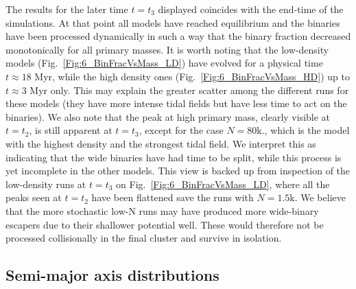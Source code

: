 The results for the later time $t = t_3$ displayed coincides with the end-time of the simulations. At that point all models have reached equilibrium and the binaries have been processed dynamically in such a way that the binary fraction decreased monotonically for all primary masses. It is worth noting that the low-density models (Fig.~\ref{Fig:6_BinFracVsMass_LD}) have evolved for a physical time $t \approx 18$ Myr, while the high density ones  (Fig.~\ref{Fig:6_BinFracVsMass_HD}) up to $t \approx 3$ Myr only. This may explain the greater scatter among the different runs for these models (they have more intense tidal fields but have less time to act on the binaries). We also note that the peak at high primary mass, clearly visible at $t = t_2$, is still apparent at $t = t_3$, except for the case $N = 80$k., which is the model with the highest density and the strongest tidal field. We interpret this as indicating that the wide binaries have had time to be split, while this process is yet incomplete in the other models. This view is backed up from inspection of the low-density runs at $t= t_3$ on Fig.~\ref{Fig:6_BinFracVsMass_LD}, where all the peaks seen at $t = t_2$ have been flattened save the runs with $N = 1.5$k. We believe that the more stochastic low-N runs may have produced more wide-binary escapers due to their shallower potential well. These would therefore not be processed collisionally in the final cluster and survive in isolation. 



\subsection{Semi-major axis distributions}

